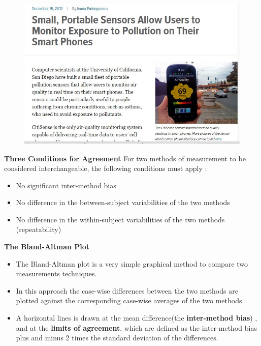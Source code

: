 \documentclass[compress]{beamer}        %
\makeatletter
\newcommand{\tcb}{\textcolor{beamer@blendedblue}}
\makeatother
\begin{document}
\begin{frame}
	\begin{figure}
\centering
\includegraphics[width=1.05\linewidth]{airqualitysensornewsarticle}

\end{figure}

\end{frame}

\begin{frame}{\bf \tcb{Three Conditions for Agreement}}
	\Large
	For two methods of measurement to be considered interchangeable, the following conditions must apply \cite{Roy2009}:
	\\
	\begin{itemize}\itemsep0.5cm
		\item No significant inter-method bias
		\item No difference in the between-subject variabilities of the two methods
		\item No difference in the within-subject variabilities of the two methods (repeatability)
	\end{itemize}
\end{frame}

\begin{frame}{\bf \tcb{The Bland-Altman Plot}}
	\large
\begin{itemize}\itemsep0.7cm

\item The Bland-Altman plot \cite{BA86,BA99} is a very simple graphical method to compare two measurements techniques. \item In this approach the case-wise differences between the two methods are plotted against the corresponding case-wise averages of the two methods.

\item A horizontal lines is drawn at the mean difference(the\textbf{ inter-method bias}) , and at the \textbf{limits of agreement}, which are defined as the inter-method bias plus and minus 2 times the standard deviation of the differences.

\end{itemize}
\end{frame}
\end{document}
